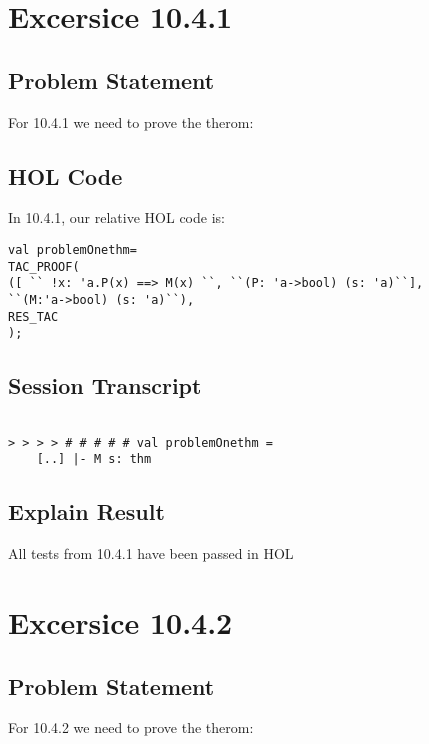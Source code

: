 \documentclass{report}
\begin{document}
\chapter{Excersice 10.4.1}
\label{Ex 1041}
\section{Problem Statement}
\label{Problem State 1041}
For 10.4.1 we need to prove the therom:



\section{HOL Code}
\label{HOl Code 1041}
In 10.4.1, our relative HOL code is:
\begin{lstlisting}[frame=trBL]
val problemOnethm=
TAC_PROOF(
([ `` !x: 'a.P(x) ==> M(x) ``, ``(P: 'a->bool) (s: 'a)``],
``(M:'a->bool) (s: 'a)``),
RES_TAC
);
\end{lstlisting}

\section{Session Transcript}
\label{Session Trans 1041}
\setcounter{sessioncount}{0}
\begin{session}
  \begin{scriptsize}
\begin{verbatim}

> > > > # # # # # val problemOnethm =
    [..] |- M s: thm
\end{verbatim}
  \end{scriptsize}
\end{session}
\section{Explain Result}
\label{explain result 1041}
All tests from 10.4.1 have been passed in HOL



\chapter{Excersice 10.4.2}
\label{Ex 1042}
\section{Problem Statement}
\label{Problem State 1042}
For 10.4.2 we need to prove the therom:
\end{document}
